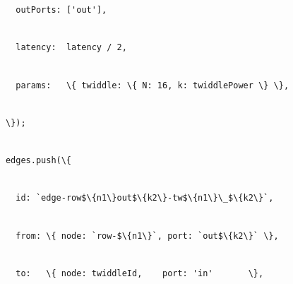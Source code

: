 \documentclass[
]{article}
\newcommand{\passthrough}[1]{#1}
\begin{document}
\passthrough{\lstinline!        !}\passthrough{\lstinline!outPorts!}\passthrough{\lstinline!:!}\passthrough{\lstinline! !}\passthrough{\lstinline!['out'],!}\strut \\
\passthrough{\lstinline!        !}\passthrough{\lstinline!latency:!}\passthrough{\lstinline!  !}\passthrough{\lstinline!latency!}\passthrough{\lstinline! !}\passthrough{\lstinline!/!}\passthrough{\lstinline! !}\passthrough{\lstinline!2,!}\strut \\
\passthrough{\lstinline!        !}\passthrough{\lstinline!params:!}\passthrough{\lstinline!   !}\passthrough{\lstinline!\{!}\passthrough{\lstinline! !}\passthrough{\lstinline!twiddle:!}\passthrough{\lstinline! !}\passthrough{\lstinline!\{!}\passthrough{\lstinline! !}\passthrough{\lstinline!N:!}\passthrough{\lstinline! !}\passthrough{\lstinline!16,!}\passthrough{\lstinline! !}\passthrough{\lstinline!k:!}\passthrough{\lstinline! !}\passthrough{\lstinline!twiddlePower!}\passthrough{\lstinline! !}\passthrough{\lstinline!\}!}\passthrough{\lstinline! !}\passthrough{\lstinline!\},!}\strut \\
\passthrough{\lstinline!      !}\passthrough{\lstinline!\});!}\strut \\
\passthrough{\lstinline!      !}\passthrough{\lstinline!edges.push!}\passthrough{\lstinline!(\{!}\strut \\
\passthrough{\lstinline!        !}\passthrough{\lstinline!id:!}\passthrough{\lstinline! !}\passthrough{\lstinline!`edge-row$\{n1\}out$\{k2\}-!}\passthrough{\lstinline!tw!}\passthrough{\lstinline!$\{n1\}\_$\{k2\}`,!}\strut \\
\passthrough{\lstinline!        !}\passthrough{\lstinline!from:!}\passthrough{\lstinline! !}\passthrough{\lstinline!\{!}\passthrough{\lstinline! !}\passthrough{\lstinline!node:!}\passthrough{\lstinline! !}\passthrough{\lstinline!`row-$\{n1\}`,!}\passthrough{\lstinline! !}\passthrough{\lstinline!port:!}\passthrough{\lstinline! !}\passthrough{\lstinline!`out$\{k2\}`!}\passthrough{\lstinline! !}\passthrough{\lstinline!\},!}\strut \\
\passthrough{\lstinline!        !}\passthrough{\lstinline!to:!}\passthrough{\lstinline!   !}\passthrough{\lstinline!\{!}\passthrough{\lstinline! !}\passthrough{\lstinline!node:!}\passthrough{\lstinline! !}\passthrough{\lstinline!twiddleId!}\passthrough{\lstinline!,!}\passthrough{\lstinline!    !}\passthrough{\lstinline!port:!}\passthrough{\lstinline! !}\passthrough{\lstinline!'in'!}\passthrough{\lstinline!       !}\passthrough{\lstinline!\},!}\strut \\
\end{document}
